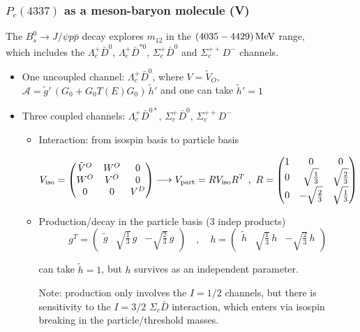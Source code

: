 \documentclass[utf8,10pt]{beamer}
\begin{document}
\begin{frame}
\frametitle{$P_{c}(4337)$ as a meson-baryon molecule (V)}

The {\color{magenta} $B_s^0 \to J/\psi p \bar{p}$} decay explores $m_{12}$ in the {\color{blue} $(4035-4429)\,{\rm MeV}$} range, \\
which includes the {\color{blue} $\Lambda_c^+ \bar{D}^0$,
  $\Lambda_c^+ \bar{D}^{*0}$, $\Sigma_c^+ \bar{D}^0$} and
  {\color{blue} $\Sigma_c^{++} {D}^-$} channels. 

\begin{itemize}
\item One uncoupled channel: $\Lambda_c^+ \bar{D}^0$, where
  {\small $V = \tilde{V}_O$, $\mathcal{A} = \tilde{g}'\,\left( G_0 + G_0 T(E) G_0 \right)\,\tilde{h}'$}  and one can take $\tilde{h}' = 1$

\item Three coupled channels: $\Lambda_c^+ \bar{D}^{0*}$, $\Sigma_c^+ \bar{D}^0$, $\Sigma_c^{++} D^{-}$
\begin{itemize}
\item Interaction: from isospin basis to particle basis

  \vspace{-0.15cm}
  {\scriptsize
  $$
  V_{\rm iso} = 
  \begin{pmatrix}
    \tilde{V}^O & W^O & 0 \\
    W^O & V^O & 0 \\
    0 & 0 & V^D
  \end{pmatrix} \longrightarrow V_{\rm part} = R V_{\rm iso} R^T \,\, , \,\,
  R =
  \begin{pmatrix}
    1 & 0 & 0 \\
    0 & \sqrt{\frac{1}{3}} & \sqrt{\frac{2}{3}} \\
    0 & -\sqrt{\frac{2}{3}} & \sqrt{\frac{1}{3}}
  \end{pmatrix}
  $$
  }
 
\item Production/decay in the particle basis (3 indep products)
  \vspace{-0.15cm}
  {\scriptsize
  $$
  g^T = \begin{pmatrix}
    \tilde{g} & \sqrt{\frac{1}{3}}\,g & -\sqrt{\frac{2}{3}}\,g
  \end{pmatrix}
  \quad , \quad
    h = \begin{pmatrix}
    \tilde{h} & \sqrt{\frac{1}{3}}\,h & -\sqrt{\frac{2}{3}}\,h
    \end{pmatrix}
    $$}

  can take $\tilde{h} = 1$, but $h$ survives as an independent parameter.

  \vspace{0.10cm}
         {\small Note: production only involves the $I=1/2$ channels,
           but there is sensitivity to the $I=3/2$ $\Sigma_c \bar{D}$
           interaction, which enters
           via isospin breaking in the particle/threshold masses.}
\end{itemize}

\end{itemize}

  
\end{frame}
\end{document}
